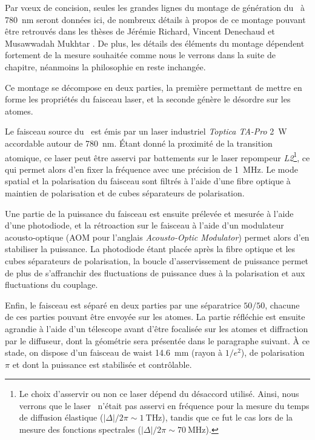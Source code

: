 Par vœux de concision, seules les grandes lignes du montage de génération du \speckle\ à \SI{780}{\nano\metre} seront données ici, de nombreux détails à propos de ce montage pouvant être retrouvés dans les thèses de Jérémie Richard, Vincent Denechaud et Musawwadah Mukhtar \citep{denechaud2018vers, mukhtar2019state, richard2015propagation}. De plus, les détails des éléments du montage dépendent fortement de la mesure souhaitée comme nous le verrons dans la suite de chapitre, néanmoins la philosophie en reste inchangée.

Ce montage se décompose en deux parties, la première permettant de mettre en forme les propriétés du faisceau laser, et la seconde génère le désordre sur les atomes.

Le faisceau source du \speckle\ est émis par un laser industriel \emph{Toptica TA-Pro} \SI{2}{\watt} accordable autour de \SI{780}{\nano\metre}. Étant donné la proximité de la transition atomique, ce laser peut être asservi par battements sur le laser repompeur \emph{L2}\footnote{Le choix d'asservir ou non ce laser dépend du désaccord utilisé. Ainsi, nous verrons que le laser \speckle\ n'était pas asservi en fréquence pour la mesure du temps de diffusion élastique ($\left|\Delta\right|/2\pi\sim\SI{1}{\tera\hertz}$), tandis que ce fut le cas lors de la mesure des fonctions spectrales ($\left|\Delta\right|/2\pi\sim\SI{70}{\mega\hertz}$).}, ce qui permet alors d'en fixer la fréquence avec une précision de \SI{1}{\mega\hertz}. Le mode spatial et la polarisation du faisceau sont filtrés à l'aide d'une fibre optique à maintien de polarisation et de cubes séparateurs de polarisation. 

Une partie de la puissance du faisceau est ensuite prélevée et mesurée à l'aide d'une photodiode, et la rétroaction sur le faisceau à l'aide d'un modulateur acousto-optique (AOM pour l'anglais \emph{Acousto-Optic Modulator}) permet alors d'en stabiliser la puissance. La photodiode étant placée après la fibre optique et les cubes séparateurs de polarisation, la boucle d'asservissement de puissance permet de plus de s'affranchir des fluctuations de puissance dues à la polarisation et aux fluctuations du couplage. 

Enfin, le faisceau est séparé en deux parties par une séparatrice $50/50$, chacune de ces parties pouvant être envoyée sur les atomes. La partie réfléchie est ensuite agrandie à l'aide d'un télescope avant d'être focalisée sur les atomes et diffraction par le diffuseur, dont la géométrie sera présentée dans le paragraphe suivant. À ce stade, on dispose d'un faisceau de waist \SI{14.6}{\milli\metre} (rayon à $1/e^2$), de polarisation $\pi$ et dont la puissance est stabilisée et contrôlable.

